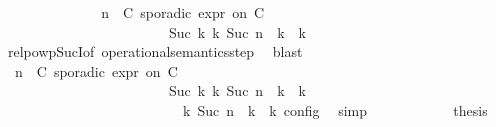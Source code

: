 \begin{isabellebody}
\ \ \ \ \ \ \ \ \ \ \isamarkupfalse%
\ \isamarkupfalse%
\ {\isacartoucheopen}{\isacharparenleft}{\isacharparenleft}{\isasymGamma}{\isacharcomma}\ n\ {\isasymturnstile}\ {\isacharparenleft}{\isacharparenleft}C\ sporadic{\isasymsharp}\ {\isasymtau}\isactrlsub e\isactrlsub x\isactrlsub p\isactrlsub r\ on\ C\ {\isacharhash}\ {\isasymPsi}{\isacharparenright}\ {\isasymtriangleright}\ {\isasymPhi}{\isacharparenright}\isanewline
\ \ \ \ \ \ \ \ \ \ \ \ \ \ \ \ \ \ \ \ \ \ \ \ {\isasymhookrightarrow}\isactrlbsup Suc\ k\isactrlesup \ {\isacharparenleft}{\isasymGamma}\isactrlsub k{\isacharcomma}\ Suc\ n\ {\isasymturnstile}\ {\isasymPsi}\isactrlsub k\ {\isasymtriangleright}\ {\isasymPhi}\isactrlsub k{\isacharparenright}{\isacharparenright}{\isacartoucheclose}\isanewline
\ \ \ \ \ \ \ \ \ \ \ \ \isamarkupfalse%
\ relpowp{\isacharunderscore}Suc{\isacharunderscore}I{}{\isacharbrackleft}of\ {\isacartoucheopen}operational{\isacharunderscore}semantics{\isacharunderscore}step{\isacartoucheclose}{\isacharbrackright}\ \isamarkupfalse%
\ blast\isanewline
\ \ \ \ \ \ \ \ \ \ \isamarkupfalse%
\ {\isacharasterisk}\ \isamarkupfalse%
\ {\isacartoucheopen}{\isacharparenleft}{\isacharparenleft}{\isasymGamma}{\isacharcomma}\ n\ {\isasymturnstile}\ {\isacharparenleft}{\isacharparenleft}C\ sporadic{\isasymsharp}\ {\isasymtau}\isactrlsub e\isactrlsub x\isactrlsub p\isactrlsub r\ on\ C\ {\isacharhash}\ {\isasymPsi}{\isacharparenright}\ {\isasymtriangleright}\ {\isasymPhi}{\isacharparenright}\isanewline
\ \ \ \ \ \ \ \ \ \ \ \ \ \ \ \ \ \ \ \ \ \ \ \ {\isasymhookrightarrow}\isactrlbsup Suc\ k\isactrlesup \ {\isacharparenleft}{\isasymGamma}\isactrlsub k{\isacharcomma}\ Suc\ n\ {\isasymturnstile}\ {\isasymPsi}\isactrlsub k\ {\isasymtriangleright}\ {\isasymPhi}\isactrlsub k{\isacharparenright}{\isacharparenright}\isanewline
\ \ \ \ \ \ \ \ \ \ \ \ \ \ \ \ \ \ \ \ \ \ {\isasymand}\ {\isasymrho}\ {\isasymin}\ {\isasymlbrakk}\ {\isasymGamma}\isactrlsub k{\isacharcomma}\ Suc\ n\ {\isasymturnstile}\ {\isasymPsi}\isactrlsub k\ {\isasymtriangleright}\ {\isasymPhi}\isactrlsub k\ {\isasymrbrakk}\isactrlsub c\isactrlsub o\isactrlsub n\isactrlsub f\isactrlsub i\isactrlsub g{\isacartoucheclose}\ \isamarkupfalse%
\ simp\isanewline
\ \ \ \ \ \ \ \ \ \ \isamarkupfalse%
\ {\isacharquery}thesis\ \isamarkupfalse%

\end{isabellebody}
